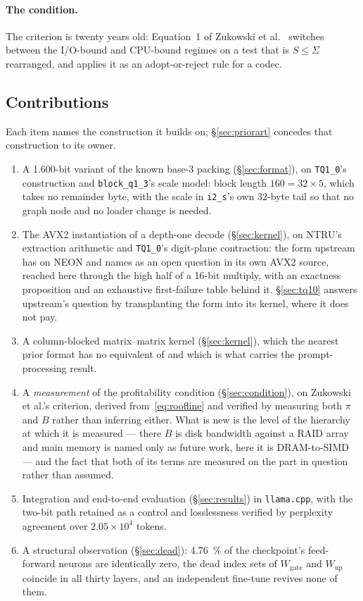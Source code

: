 \documentclass[11pt,a4paper]{article}
\newcommand{\code}[1]{\texttt{#1}}
\begin{document}
\paragraph{The condition.} The criterion is twenty years old: Equation~1 of
Zukowski et al.~\cite{zukowski} switches between the I/O-bound and CPU-bound
regimes on a test that is $S\le\Sigma$ rearranged, and applies it as an
adopt-or-reject rule for a codec.

\subsection{Contributions}\label{sec:contrib}
Each item names the construction it builds on; \S\ref{sec:priorart} concedes
that construction to its owner.
\begin{enumerate}
\item A \num{1.600}-bit variant of the known base-3 packing
      (\S\ref{sec:format}), on \code{TQ1\_0}'s construction and
      \code{block\_q1\_3}'s scale model: block length $160=32\times5$, which
      takes no remainder byte, with the scale in \code{i2\_s}'s own 32-byte
      tail so that no graph node and no loader change is needed.
\item The AVX2 instantiation of a depth-one decode (\S\ref{sec:kernel}), on
      NTRU's extraction arithmetic and \code{TQ1\_0}'s digit-plane
      contraction: the form upstream has on NEON and names as an open question
      in its own AVX2 source, reached here through the high half of a 16-bit
      multiply, with an exactness proposition and an exhaustive
      first-failure table behind it. \S\ref{sec:tq10} answers upstream's
      question by transplanting the form into its kernel, where it does not pay.
\item A column-blocked matrix--matrix kernel (\S\ref{sec:kernel}), which the
      nearest prior format has no equivalent of and which is what carries the
      prompt-processing result.
\item A \emph{measurement} of the profitability condition
      (\S\ref{sec:condition}), on Zukowski et al.'s criterion, derived
      from~\eqref{eq:roofline} and verified by
      measuring both $\pi$ and $B$ rather than inferring either. What is new is
      the level of the
      hierarchy at which it is measured --- there $B$ is disk bandwidth against
      a RAID array and main memory is named only as future work, here it is
      DRAM-to-SIMD --- and the fact that both of its terms are measured on the
      part in question rather than assumed.
\item Integration and end-to-end evaluation (\S\ref{sec:results}) in
      \code{llama.cpp}, with the two-bit path retained as a control and
      losslessness verified by perplexity agreement over
      $\num{2.05}\times10^{4}$ tokens.
\item A structural observation (\S\ref{sec:dead}): \SI{4.76}{\percent} of the
      checkpoint's feed-forward neurons are identically zero, the dead index
      sets of $W_{\text{gate}}$ and $W_{\text{up}}$ coincide in all thirty
      layers, and an independent fine-tune revives none of them.
\end{enumerate}
\end{document}
